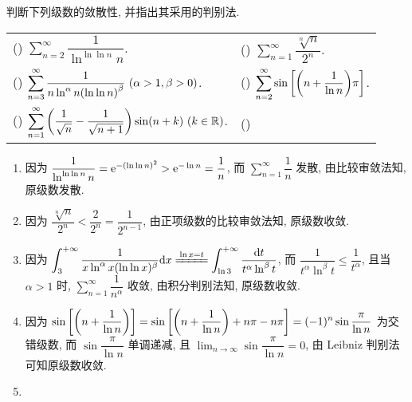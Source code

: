 \begin{example}
    判断下列级数的敛散性, 并指出其采用的判别法.
    \setcounter{magicrownumbers}{0}
    \begin{table}[H]
        \centering
        \begin{tabular}{l|l}
            (\rownumber{}) $ \displaystyle \sum_{n=2}^{\infty} \dfrac{1}{\ln ^{\ln\ln n}n} $. & (\rownumber{}) $ \displaystyle \sum_{n=1}^{\infty} \dfrac{\sqrt[n]{n}}{2^n} $.\\
            (\rownumber{}) $ \displaystyle \sum_{n=3}^{\infty} \dfrac{1}{n \ln^{\alpha}n\qty(\ln \ln n)^\beta} ~(\alpha>1,\beta>0)$. & (\rownumber{}) $ \displaystyle \sum_{n=2}^{\infty} \sin\qty[\qty(n+\dfrac{1}{\ln n})\pi] $.\\ 
            (\rownumber{}) $ \displaystyle \sum_{n=1}^{\infty} \qty(\dfrac{1}{\sqrt{n}}-\dfrac{1}{\sqrt{n+1}})\sin(n+k) ~(k\in \mathbb{R})$.& (\rownumber{}) 
        \end{tabular}
    \end{table}
\end{example}
\begin{solution}
    \begin{enumerate}[label=(\arabic{*})]
        \item 因为 $\dfrac{1}{\ln ^{\ln \ln n}n}=\mathrm{e} ^{-(\ln \ln n)^2}>\mathrm{e} ^{-\ln n}=\dfrac{1}{n}$, 而 $ \displaystyle \sum_{n=1}^{\infty} \dfrac{1}{n} $ 发散, 由比较审敛法知, 原级数发散.
        \item 因为 $ \displaystyle \dfrac{\sqrt[n]{n}}{2^n} <\dfrac{2}{2^n}=\dfrac{1}{2^{n-1}}$, 由正项级数的比较审敛法知, 原级数收敛.
        \item 因为 $ \displaystyle \int_{3}^{+\infty} \dfrac{1}{x\ln^\alpha x(\ln\ln x)^\beta} \dd x \xlongequal{\ln x=t}\int_{\ln 3}^{+\infty} \dfrac{\dd t}{t^\alpha\ln^\beta t}$, 而 
        $ \displaystyle \dfrac{1}{t^\alpha\ln^\beta t} \leqslant \dfrac{1}{t^\alpha}$, 且当 $\alpha>1$ 时, $ \displaystyle \sum_{n=1}^{\infty} \dfrac{1}{n^\alpha} $ 收敛, 由积分判别法知, 原级数收敛.
        \item 因为 $ \displaystyle \sin\qty[\qty(n+\dfrac{1}{\ln n})] =\sin\qty[\qty(n+\dfrac{1}{\ln n})+n\pi-n\pi] =(-1)^n\sin\dfrac{\pi}{\ln n}$ 为交错级数, 而 $\sin\dfrac{\pi}{\ln n}$ 单调递减, 且 $ \displaystyle \lim_{n \to \infty} \sin\dfrac{\pi}{\ln n}=0$, 由 Leibniz 判别法可知原级数收敛.
        \item 
    \end{enumerate}
\end{solution}

